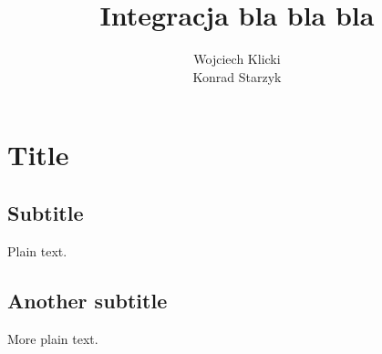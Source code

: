 \documentclass{article}
\begin{document}
\title{Integracja bla bla bla}
\author{Wojciech Klicki\\Konrad Starzyk}
\date{}
\maketitle
\section{Title}

\subsection{Subtitle}

Plain text.

\subsection{Another subtitle}

More plain text.
\end{document}
